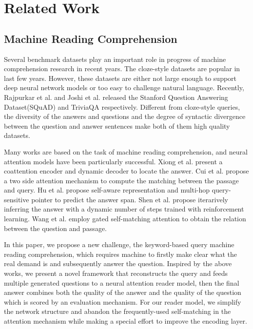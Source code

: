 \documentclass[sigconf]{acmart}
\begin{document}
\section{Related Work}
\subsection{Machine Reading Comprehension}
Several benchmark datasets play an important role in progress of machine comprehension research in recent years. The cloze-style datasets\citep{hill2015goldilocks}\cite{hermann2015teaching}\cite{onishi2016did}\cite{paperno2016lambada} are popular in last few years. However, these datasets are either not large enough to support deep neural network models or too easy to challenge natural language. Recently, Rajpurkar et al.\cite{rajpurkar2016squad} and Joshi et al.\cite{joshi2017triviaqa} released the Stanford Question Answering Dataset(SQuAD) and TriviaQA respectively. Different from cloze-style queries, the diversity of the answers and questions and the degree of syntactic divergence between the question and answer sentences make both of them high quality datasets. 

Many works are based on the task of machine reading comprehension, and neural attention models have been particularly 
successful\cite{xiong2016dynamic}\cite{cui2016attention}\cite{wang2016multi}\cite{seo2016bidirectional}\cite{Zhang2017Exploring}\cite{Gong2017Ruminating}. Xiong et al.\cite{xiong2016dynamic} present a coattention encoder and dynamic decoder to locate the answer. Cui et al.\cite{cui2016attention} propose a two side attention mechanism to compute the matching between the passage and query. Hu et al.\cite{hu2017mnemonic} propose self-aware representation and multi-hop query-sensitive pointer to predict the answer span. Shen et al.\cite{shen2016reasonet} propose iterarively inferring the answer with a dynamic number of steps trained with reinforcement learning. Wang et al.\cite{rnet} employ gated self-matching attention to obtain the relation between the question and passage.

In this paper, we propose a new challenge, the keyword-based query machine reading comprehension, which requires machine to firstly make clear what the real demand is and subsequently answer the question. Inspired by the above works, we present a novel framework that reconstructs the query and feeds multiple generated questions to a neural attention reader model, then the final answer combines both the quality of the answer and the quality of the question which is scored by an evaluation mechanism. For our reader model, we simplify the network structure and abandon the frequently-used self-matching in the attention mechanism while making a special effort to improve the encoding layer. 
\end{document}
